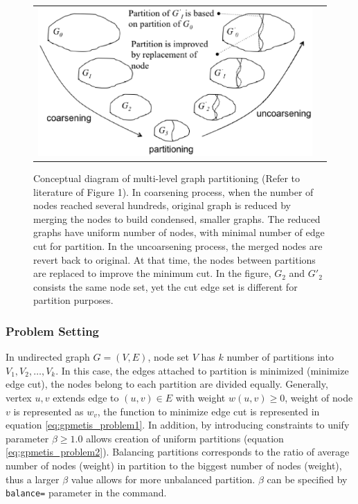 \begin{figure}[htbp]
\begin{center}
\begin{tabular}{cc}

\begin{minipage}{1.0\hsize}
\begin{center}
\includegraphics[scale=0.5]{figure/mgpmetis_abst.eps}
\caption{Conceptual diagram of multi-level graph partitioning (Refer to literature \cite{Karypis1999} of Figure 1).
In coarsening process, when the number of nodes reached several hundreds, original graph is reduced by merging the nodes to build condensed, smaller graphs. 
The reduced graphs have uniform number of nodes, with minimal number of edge cut for partition. In the uncoarsening process, the merged nodes are revert back to original. At that time, the nodes between partitions are replaced to improve the minimum cut. 
In the figure, $G_2$ and $G'_2$ consists the same node set, yet the cut edge set is different for partition purposes.} 
\label{fig:mgpmetis_abst}
\end{center}
\end{minipage}

\end{tabular} 
\end{center}
\end{figure} 



\subsubsection{Problem Setting}
In undirected graph  $G=(V,E)$, node set $V$ has $k$ number of partitions into $V_1,V_2,\dots,V_k$. 
In this case, the edges attached to partition is minimized (minimize edge cut), 
the nodes belong to each partition are divided equally. 
Generally, vertex $u,v$ extends edge to $(u,v)\in E$ with weight $w(u,v)\ge 0$, weight of node $v$ is represented as $w_v$, the function to minimize edge cut is represented in equation \ref{eq:gpmetis_problem1}. 
In addition, by introducing constraints to unify parameter $\beta\ge 1.0$ allows creation of uniform partitions (equation \ref{eq:gpmetis_problem2}). 
Balancing partitions corresponds to the ratio of average number of nodes (weight) in partition to the biggest number of nodes (weight), thus a larger  $\beta$ value allows for more unbalanced partition. 
$\beta$ can be specified by \verb|balance=| parameter in the command. 


